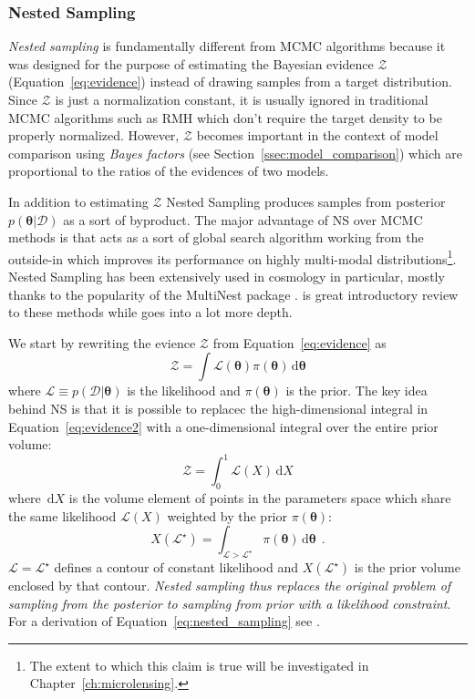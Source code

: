 \documentclass[12pt,dvipsnames]{report}
\newcommand{\ud}{\,\mathrm{d}}
\renewcommand{\vec}[1]{\boldsymbol{\mathbf{#1}}}
\newcommand{\hquad}{~~}
\begin{document}
\subsubsection{Nested Sampling}
\textsl{Nested sampling} \citep{2004AIPC..735..395S}  is fundamentally different 
from MCMC algorithms  because it was designed for the purpose  of estimating the
Bayesian evidence  $\mathcal{Z}$ (Equation~\ref{eq:evidence}) instead of drawing samples 
from  a target distribution.
Since $\mathcal{Z}$ is just a normalization constant, it is usually ignored 
in traditional MCMC algorithms such as RMH which don't require the target 
density to be properly normalized.
However, $\mathcal{Z}$  becomes important in the context of model comparison 
using \textsl{Bayes factors} (see Section~\ref{ssec:model_comparison}) which
are proportional to the ratios of the evidences of two models. 

In addition to estimating $\mathcal{Z}$ Nested Sampling produces samples 
from posterior $p(\vec\theta\lvert \mathcal{D})$ as a sort of byproduct. 
The major advantage of NS over MCMC methods is that acts as a sort of 
global search algorithm working from the outside-in which improves its 
performance on highly multi-modal distributions\footnote{
    The extent to which this claim is true will be investigated in 
    Chapter~\ref{ch:microlensing}.
}. Nested Sampling has been extensively used in cosmology in particular, mostly 
thanks to the popularity of the \textsf{MultiNest} package \citep{arXiv:0809.3437}. 
\citet{arXiv:2205.15570} is great introductory review to these methods while 
\citet{arXiv:2101.09675} goes into a lot more depth.

We start by rewriting the evience $\mathcal{Z}$ from Equation~\ref{eq:evidence}
as 
\begin{equation}
\mathcal{Z}=\int \mathcal{L}(\vec\theta) \pi(\vec \theta)\ud\vec\theta
\label{eq:evidence2}
\end{equation}
where  $\mathcal{L}\equiv p(\mathcal{D}\lvert\vec \theta)$ is the likelihood 
and $\pi(\vec \theta)$ is the prior. The key idea behind NS is that it is possible 
to replacec the high-dimensional integral in Equation~\ref{eq:evidence2} with 
a one-dimensional integral over the entire prior volume: 
\begin{equation}
    \mathcal{Z}=\int_{0}^{1} \mathcal{L}(X) \ud X
    \label{eq:nested_sampling}
\end{equation}
where $\ud X$ is the volume element of points in the parameters space which 
share the same likelihood $\mathcal{L}(X)$ weighted by the prior $\pi(\vec\theta)$:
\begin{equation}
X\left(\mathcal{L}^{\star}\right)=\int_{\mathcal{L}>\mathcal{L}^{\star}} \pi(\vec\theta) \ud \vec\theta\hquad .
\end{equation}
$\mathcal{L}=\mathcal{L}^\star$ defines a contour of constant likelihood and 
$X(\mathcal{L}^\star)$ is the prior volume enclosed by that contour.
\emph{Nested sampling thus replaces the original problem of sampling from the posterior 
to  sampling from prior with a likelihood constraint}.
For a derivation of Equation~\ref{eq:nested_sampling} see \citet{arXiv:2205.15570}.
\end{document}
